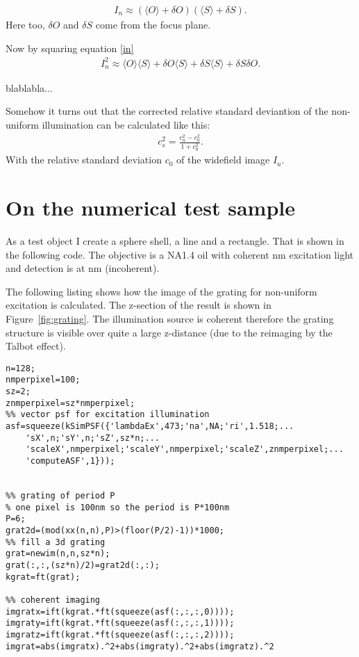\documentclass[11pt,abstracton,titlepage]{scrartcl}
\newcommand{\avg}[1]{\langle #1 \rangle}
\newcommand{\figref}[1]{Figure~\ref{#1}}
\begin{document}
\begin{align}
\label{in}
  I_n\approx (\avg{O}+\delta O)(\avg{S}+\delta S).
\end{align}
Here too, $\delta O$ and $\delta S$ come from the focus plane.

Now by squaring equation \ref{in}
\begin{align}
  I_n^2\approx \avg{O}\avg{S} + \delta O \avg{S} +\delta S\avg{S} +
  \delta S \delta O.
\end{align}

blablabla...

Somehow it turns out that the corrected relative standard deviantion
of the non-uniform illumination can be calculated like this:
\begin{align} 
  c_s^2=\frac{c_n^2-c_0^2}{1+c_0^2}.
\end{align}
With the relative standard deviation $c_0$ of the widefield image
$I_u$.


\section{On the numerical test sample}


As a test object I create a sphere shell, a line and a rectangle.
That is shown in the following code.  The objective is a NA1.4 oil
with coherent \unit[473]{nm} excitation light and detection is at
\unit[520]{nm} (incoherent).

The following listing shows how the image of the grating for
non-uniform excitation is calculated. The z-section of the result is
shown in \figref{fig:grating}. The illumination source is coherent
therefore the grating structure is visible over quite a large
z-distance (due to the reimaging by the Talbot effect).


\begin{lstlisting}
n=128;
nmperpixel=100;
sz=2;
znmperpixel=sz*nmperpixel;
%% vector psf for excitation illumination
asf=squeeze(kSimPSF({'lambdaEx',473;'na',NA;'ri',1.518;...
    'sX',n;'sY',n;'sZ',sz*n;...
    'scaleX',nmperpixel;'scaleY',nmperpixel;'scaleZ',znmperpixel;...
    'computeASF',1}));


%% grating of period P
% one pixel is 100nm so the period is P*100nm
P=6;
grat2d=(mod(xx(n,n),P)>(floor(P/2)-1))*1000;
%% fill a 3d grating
grat=newim(n,n,sz*n);
grat(:,:,(sz*n)/2)=grat2d(:,:);
kgrat=ft(grat);

%% coherent imaging
imgratx=ift(kgrat.*ft(squeeze(asf(:,:,:,0))));
imgraty=ift(kgrat.*ft(squeeze(asf(:,:,:,1))));
imgratz=ift(kgrat.*ft(squeeze(asf(:,:,:,2))));
imgrat=abs(imgratx).^2+abs(imgraty).^2+abs(imgratz).^2
\end{lstlisting}
\end{document}
